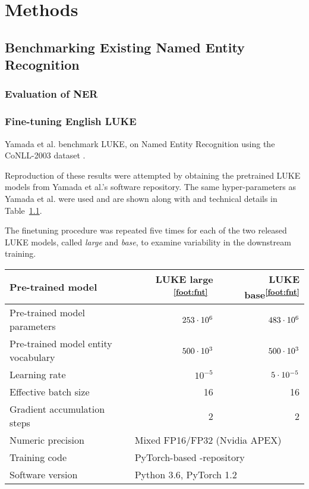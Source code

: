 \documentclass[main.tex]{subfiles}
\begin{document}
\chapter{Methods}

\section{Benchmarking Existing Named Entity Recognition}
\subsection{Evaluation of NER}
\label{subsec:nereval}
\subsection{Fine-tuning English LUKE}
Yamada et al. benchmark LUKE, on Named Entity Recognition using the CoNLL-2003 dataset \cite{yamada2020luke}.

Reproduction of these results were attempted by obtaining the pretrained LUKE models from Yamada et al.'s software repository.
The same hyper-parameters as Yamada et al. were used and are shown along with and technical details in Table~\ref{tab:params}.

The finetuning procedure was repeated five times for each of the two released LUKE models, called \emph{large} and \emph{base}, to examine variability in the downstream training.
\addtocounter{footnote}{1}
\begin{table}[H]
    \centering
    \begin{tabular}{l|rr}
        Pre-trained model
                                    & LUKE large \textsuperscript{\ref{foot:fnt}}\
                                                & LUKE base\textsuperscript{\ref{foot:fnt}}\\\hline
        Pre-trained model parameters & $253\cdot10^{6}$ & $483\cdot10^{6}$\\
        Pre-trained model entity vocabulary & $500\cdot10^{3}$ & $500\cdot10^{3}$\\
        Learning rate               & $10^{-5}$ & $5\cdot10^{-5}$\\
        Effective batch size        & 16 & 16\\
        Gradient accumulation steps & 2 & 2\\
        Numeric precision           & \multicolumn{2}{l}{Mixed FP16/FP32 (Nvidia APEX)}\\
        Training code               & \multicolumn{2}{l}{PyTorch-based \code{luke}-repository \protect\footnotemark}\\
        Software version            & \multicolumn{2}{l}{Python 3.6, PyTorch 1.2}
    \end{tabular}
    \label{tab:params}
\end{table}
\end{document}
